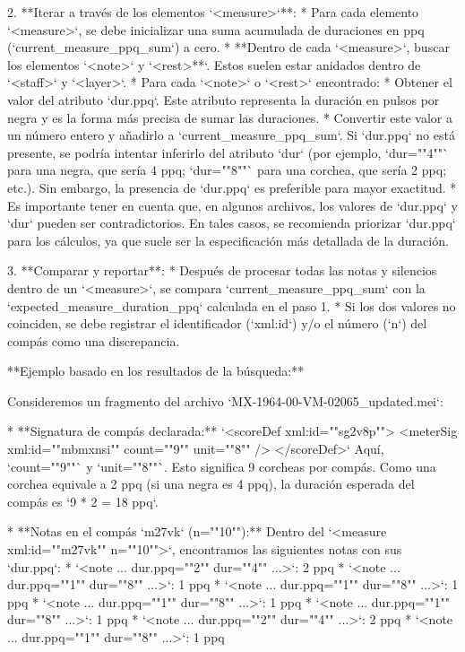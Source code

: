 \begin{itemize}
2.  **Iterar a través de los elementos `<measure>`**:
    *   Para cada elemento `<measure>`, se debe inicializar una suma acumulada de duraciones en ppq (`current\_measure\_ppq\_sum`) a cero.
    *   **Dentro de cada `<measure>`, buscar los elementos `<note>` y `<rest>**`. Estos suelen estar anidados dentro de `<staff>` y `<layer>`.
    *   Para cada `<note>` o `<rest>` encontrado:
        *   Obtener el valor del atributo `dur.ppq`. Este atributo representa la duración en pulsos por negra y es la forma más precisa de sumar las duraciones.
        *   Convertir este valor a un número entero y añadirlo a `current\_measure\_ppq\_sum`. Si `dur.ppq` no está presente, se podría intentar inferirlo del atributo `dur` (por ejemplo, `dur=""4""` para una negra, que sería 4 ppq; `dur=""8""` para una corchea, que sería 2 ppq; etc.). Sin embargo, la presencia de `dur.ppq` es preferible para mayor exactitud.
        *   Es importante tener en cuenta que, en algunos archivos, los valores de `dur.ppq` y `dur` pueden ser contradictorios. En tales casos, se recomienda priorizar `dur.ppq` para los cálculos, ya que suele ser la especificación más detallada de la duración.

3.  **Comparar y reportar**:
    *   Después de procesar todas las notas y silencios dentro de un `<measure>`, se compara `current\_measure\_ppq\_sum` con la `expected\_measure\_duration\_ppq` calculada en el paso 1.
    *   Si los dos valores no coinciden, se debe registrar el identificador (`xml:id`) y/o el número (`n`) del compás como una discrepancia.

**Ejemplo basado en los resultados de la búsqueda:**

Consideremos un fragmento del archivo `MX-1964-00-VM-02065\_updated.mei`:

*   **Signatura de compás declarada:**
    `<scoreDef xml:id=""sg2v8p""> <meterSig xml:id=""mbmxnsi"" count=""9"" unit=""8"" /> </scoreDef>`
    Aquí, `count=""9""` y `unit=""8""`. Esto significa 9 corcheas por compás.
    Como una corchea equivale a 2 ppq (si una negra es 4 ppq), la duración esperada del compás es `9 * 2 = 18 ppq`.

*   **Notas en el compás `m27vk` (n=""10""):**
    Dentro del `<measure xml:id=""m27vk"" n=""10"">`, encontramos las siguientes notas con sus `dur.ppq`:
    *   `<note ... dur.ppq=""2"" dur=""4"" ...>`: 2 ppq
    *   `<note ... dur.ppq=""1"" dur=""8"" ...>`: 1 ppq
    *   `<note ... dur.ppq=""1"" dur=""8"" ...>`: 1 ppq
    *   `<note ... dur.ppq=""1"" dur=""8"" ...>`: 1 ppq
    *   `<note ... dur.ppq=""1"" dur=""8"" ...>`: 1 ppq
    *   `<note ... dur.ppq=""2"" dur=""4"" ...>`: 2 ppq
    *   `<note ... dur.ppq=""1"" dur=""8"" ...>`: 1 ppq


\end{itemize}
